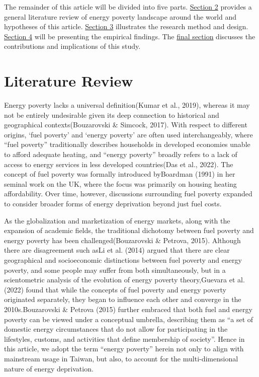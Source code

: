 \documentclass[
  twoside,
  openright,
  degree    = master,               %
  language  = english,              %
  fontset   = overleaf,             %
  watermark = true,                 %
  doi       = true,                 %
]{ntuthesis}
\begin{document}
The remainder of this article will be divided into five parts.
\protect\hyperlink{sec:literaturereview}{Section 2} provides a general
literature review of energy poverty landscape around the world and
hypotheses of this article. \protect\hyperlink{sec:methodology}{Section
3} illustrates the research method and design.
\protect\hyperlink{sec:results}{Section 4} will be presenting the
empirical findings. The \protect\hyperlink{sec:conclusion}{final
section} discusses the contributions and implications of this study.

\hypertarget{sec:literaturereview}{%
\chapter{Literature Review}\label{sec:literaturereview}}

Energy poverty lacks a universal definition(Kumar et al., 2019), whereas
it may not be entirely undesirable given its deep connection to
historical and geographical contexts(Bouzarovski \& Simcock, 2017). With
respect to different origins, `fuel poverty' and `energy poverty' are
often used interchangeably, where ``fuel poverty'' traditionally
describes households in developed economies unable to afford adequate
heating, and ``energy poverty'' broadly refers to a lack of access to
energy services in less developed countries(Das et al., 2022). The
concept of fuel poverty was formally introduced byBoardman (1991) in her
seminal work on the UK, where the focus was primarily on housing heating
affordability. Over time, however, discussions surrounding fuel poverty
expanded to consider broader forms of energy deprivation beyond just
fuel costs.

As the globalization and marketization of energy markets, along with the
expansion of academic fields, the traditional dichotomy between fuel
poverty and energy poverty has been challenged(Bouzarovski \& Petrova,
2015). Although there are disagreement such asLi et al. (2014) argued
that there are clear geographical and socioeconomic distinctions between
fuel poverty and energy poverty, and some people may suffer from both
simultaneously, but in a scientometric analysis of the evolution of
energy poverty theory,Guevara et al. (2022) found that while the
concepts of fuel poverty and energy poverty originated separately, they
began to influence each other and converge in the 2010s.Bouzarovski \&
Petrova (2015) further embraced that both fuel and energy poverty can be
viewed under a conceptual umbrella, describing them as ``a set of
domestic energy circumstances that do not allow for participating in the
lifestyles, customs, and activities that define membership of society''.
Hence in this article, we adopt the term ``energy poverty'' herein not
only to align with mainstream usage in Taiwan, but also, to account for
the multi-dimensional nature of energy deprivation.
\end{document}
